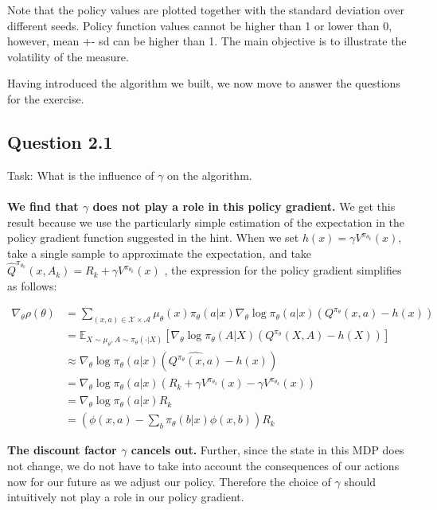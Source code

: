 \documentclass[a4paper, 11pt]{article} %
\begin{document}
Note that the policy values are plotted together with the standard deviation over different seeds. Policy function values cannot be higher than 1 or lower than 0, however, mean +- sd can be higher than 1. The main objective is to illustrate the volatility of the measure.

Having introduced the algorithm we built, we now move to answer the questions for the exercise.

\subsection*{Question 2.1}

Task: What is the influence of $\gamma$ on the algorithm.
\\
\\
\textbf{We find that $\gamma$ does not play a role in this policy gradient.} We get this result because we use the particularly simple estimation of the expectation in the policy gradient function suggested in the hint. When we set $h(x)=\gamma V^{\pi_{\theta_{k}}}(x)$, take a single sample to approximate the expectation, and take $\widehat{Q}^{\pi_{\theta_{k}}}\left(x, A_{k}\right)=R_{k}+\gamma V^{\pi_{\theta_{k}}}(x)$ , the expression for the policy gradient simplifies as follows:

\begin{align} \nabla_{\theta} \rho(\theta)
&=\sum_{(x, a) \in \mathcal{X} \times \mathcal{A}} \mu_{\theta}(x) \pi_{\theta}(a | x) \nabla_{\theta} \log \pi_{\theta}(a | x)\left(Q^{\pi_\theta}(x, a)-h(x)\right) \\
&=\mathbb{E}_{X \sim \mu_{\theta}, A \sim \pi_{\theta}(\cdot | X)}\left[\nabla_{\theta} \log \pi_{\theta}(A | X)\left(Q^{\pi_{\theta}}(X, A)-h(X)\right)\right] \\
&\approx \nabla_{\theta} \log \pi_{\theta}(a | x)  \left(\widehat{Q^{\pi_{\theta}}(x, a)}-h(x)\right) \\
&=\nabla_{\theta} \log \pi_{\theta}(a | x)  \left(R_{k}+\gamma V^{\pi_{\theta_{k}}}(x) - \gamma V^{\pi_{\theta_{k}}}(x)\right) \\
&=\nabla_{\theta} \log \pi_{\theta}(a | x)  R_{k} \\
&=\left(  \phi(x, a)-\sum_{b} \pi_{\theta}(b|x) \phi(x, b)\right)R_{k}
\end{align}

\textbf{The discount factor $\gamma$ cancels out.} Further, since the state in this MDP does not change, we do not have to take into account the consequences of our actions now for our future as we adjust our policy. Therefore the choice of  $\gamma$ should intuitively not play a role in our policy gradient.
\end{document}
